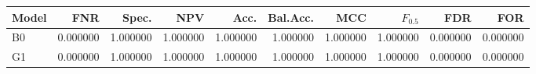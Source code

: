 \begin{tabular}{lrrrrrrrrr}
\toprule
Model & FNR & Spec. & NPV & Acc. & Bal.Acc. & MCC & $F_{0.5}$ & FDR & FOR \\
\midrule
B0 & 0.000000 & 1.000000 & 1.000000 & 1.000000 & 1.000000 & 1.000000 & 1.000000 & 0.000000 & 0.000000 \\
G1 & 0.000000 & 1.000000 & 1.000000 & 1.000000 & 1.000000 & 1.000000 & 1.000000 & 0.000000 & 0.000000 \\
\bottomrule
\end{tabular}
